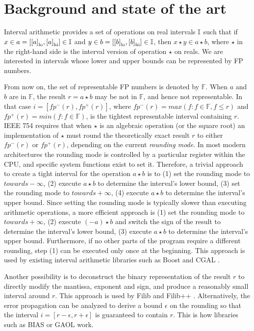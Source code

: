 
\section{Background and state of the art}
\label{sec:related}

Interval arithmetic \cite{hickey2001} provides a set of operations on real intervals $\mathbb{I}$ such that if $x\in a=[{[a]}_{\textrm{lo}},{[a]}_{\textrm{hi}}] \in \mathbb{I}$ and $y\in b=[{[b]}_{\textrm{lo}},{[b]}_{\textrm{hi}}] \in \mathbb{I}$,
then $x \star y  \in a \star b$, where $\star$ in the right-hand side is the interval version of operation $\star$ on reals.
We are interested in intervals whose lower and upper bounds can be represented by FP numbers. 

From now on, the set of representable FP numbers is denoted by $\mathbb{F}$. When $a$ and $b$ are in $\mathbb{F}$, the result $r = a \star b$ may be not in $\mathbb{F}$, and hence not representable. In that case $i=[fp^{-}(r),fp^{+}(r)]$, where $fp^{-}(r) = max(f : f \in \mathbb{F}, f \leq r)$ and $fp^{+}(r) = min(f : f \in \mathbb{F})$, is the tightest representable interval containing $r$.
IEEE 754 requires that when $\star$ is an algebraic operation (or the square root) an implementation of $\star$ must round the theoretically exact result $r$ to either $fp^{-}(r)$ or $fp^{+}(r)$, depending on the current \emph{rounding mode}.
In most modern architectures the rounding mode is controlled by a particular register within the CPU, and specific system functions exist to set it. Therefore, a trivial approach to create a tight interval for the operation $a \star b$ is to (1) set the rounding mode to $towards -\infty$, (2) execute $a \star b$ to determine the interval's lower bound, (3) set the rounding mode to $towards +\infty$, (4) execute $a \star b$ to determine the interval's upper bound.
Since setting the rounding mode is typically slower than executing arithmetic operations, a more efficient approach is (1) set the rounding mode to $towards +\infty$, (2) execute $(-a) \star b$ and switch the sign of the result to determine the interval's lower bound, (3) execute $a \star b$ to determine the interval's upper bound. Furthermore, if no other parts of the program require a different rounding, step (1) can be executed only once at the beginning.
This approach is used by existing interval arithmetic libraries such as Boost \cite{bronnimann2006} and CGAL \cite{cgal}.

Another possibility is to deconstruct the binary representation of the result $r$ to directly modify the mantissa, exponent and sign, and produce a reasonably small interval around $r$. This approach is used by Filib and Filib++ \cite{filib}.
Alternatively, the error propagation can be analyzed to derive a bound $\epsilon$ on the rounding so that the interval $i=[r-\epsilon,r+\epsilon]$ is guaranteed to contain $r$. This is how libraries such as BIAS \cite{bias} or GAOL \cite{gaol} work.


